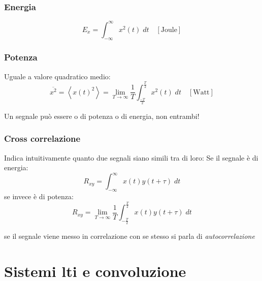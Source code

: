 \subsubsection*{Energia}
\[
	E_x = \int_{-\infty }^{\infty } x^2 \left(t\right) \; dt \quad \left[\text{Joule}\right]
\]
\subsubsection*{Potenza}
Uguale a valore quadratico medio:
\[
	\overline{x^2 } = \left<x\left(t\right)^2 \right> = \lim_{T \to \infty} \frac{1}{T} \int_{\frac{-T}{2}}^{\frac{T}{2}} x^2 \left(t\right) \; dt \quad \left[\text{Watt}\right]
\]

Un segnale può essere o di potenza o di energia, non entrambi!

\subsubsection*{Cross correlazione}
Indica intuitivamente quanto due segnali siano simili tra di loro:
\vskip3mm
Se il segnale è di energia:
\[
	R_{xy} = \int_{-\infty }^{\infty } x\left(t\right) y \left(t + \tau \right) \; dt
\]
se invece è di potenza:
\[
	R_{xy} = \lim_{T \to \infty} \frac{1}{T}\int_{-\frac{T}{2} }^{\frac{T}{2} } x\left(t\right) y \left(t + \tau \right) \; dt
\]

se il segnale viene messo in correlazione con se stesso si parla di \textit{autocorrelazione}

\section{Sistemi lti e convoluzione}

